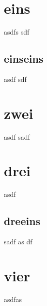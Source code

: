 \documentclass[a4paper,12pt,twoside,ngerman]{article}
\begin{document}
 
\tableofcontents %
\newpage 
\section{eins} 
asdfs  sdf 
\newpage 
\subsection{einseins} 
asdf sdf 
\newpage 
\begin{appendix} 
\appendixpage 
\renewcommand\thetable{\thesection\arabic{table}} 
\renewcommand\thefigure{\thesection\arabic{figure}} 
\section{zwei} 
asdf sadf 
\newpage 
\section{drei} 
asdf 
\subsection{dreeins} 
sadf as df 
\newpage 
\end{appendix} 
\section{vier} 
asdfas 
\end{document}
